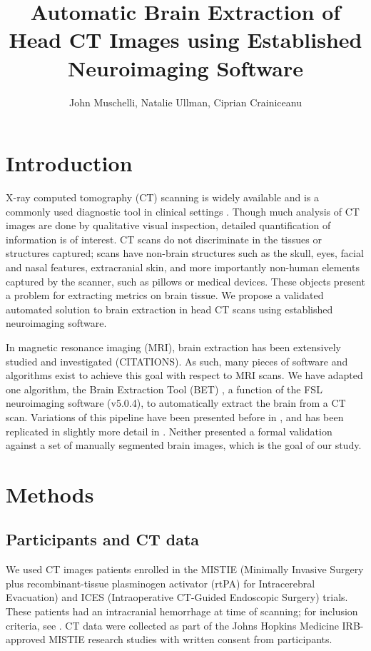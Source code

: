 \documentclass{article}\usepackage[]{graphicx}\usepackage[]{color}
\title{Automatic Brain Extraction of Head CT Images using Established Neuroimaging Software}
\author{John Muschelli, Natalie Ullman, Ciprian Crainiceanu}
\begin{document}
\renewcommand{\thesubfigure}{\Alph{subfigure}}

\maketitle








\section{Introduction}

X-ray computed tomography (CT) scanning is widely available and is a commonly used diagnostic tool in clinical settings \citep{sahni_management_2007}. Though much analysis of CT images are done by qualitative visual inspection, detailed quantification of information is of interest.  CT scans do not discriminate in the tissues or structures captured; scans have non-brain structures such as the skull, eyes, facial and nasal features, extracranial skin, and more importantly non-human elements captured by the scanner, such as pillows or medical devices.  These objects present a problem for extracting metrics on brain tissue.  We propose a validated automated solution to brain extraction in head CT scans using established neuroimaging software.

In magnetic resonance imaging (MRI), brain extraction has been extensively studied and investigated (CITATIONS).  As such, many pieces of software and algorithms exist to achieve this goal with respect to MRI scans.  We have adapted one algorithm, the Brain Extraction Tool (BET) \citep{smith_fast_2002}, a function of the FSL \citep{jenkinson_fsl_2012} neuroimaging software (v5.0.4), to automatically extract the brain from a CT scan.  Variations of this pipeline have been presented before in \citet{able}, and has been replicated in slightly more detail in \citet{rorden_age-specific_2012}.  Neither presented a formal validation against a set of manually segmented brain images, which is the goal of our study. 


\section{Methods}
\subsection{ Participants and CT data}
We used CT images patients enrolled in the MISTIE (Minimally Invasive Surgery plus recombinant-tissue plasminogen activator (rtPA) for Intracerebral Evacuation) and ICES (Intraoperative CT-Guided Endoscopic Surgery) trials.  These patients had an intracranial hemorrhage at time of scanning; for inclusion criteria, see \citet{mould_minimally_2013}. CT data were collected as part of the Johns Hopkins Medicine IRB-approved MISTIE research studies with written consent from participants.  
\end{document}
